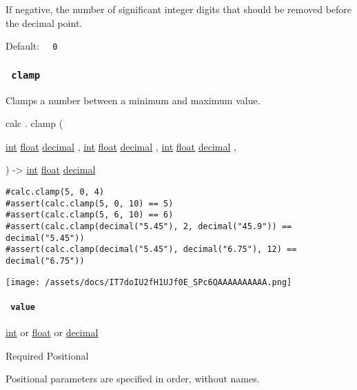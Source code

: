 If negative, the number of significant integer digits that should be
removed before the decimal point.

Default: \texttt{\ }{\texttt{\ 0\ }}\texttt{\ }

\subsubsection{\texorpdfstring{\texttt{\ clamp\ }}{ clamp }}\label{functions-clamp}

Clamps a number between a minimum and maximum value.

calc { . } { clamp } (

{ \href{/docs/reference/foundations/int/}{int}
\href{/docs/reference/foundations/float/}{float}
\href{/docs/reference/foundations/decimal/}{decimal} , } {
\href{/docs/reference/foundations/int/}{int}
\href{/docs/reference/foundations/float/}{float}
\href{/docs/reference/foundations/decimal/}{decimal} , } {
\href{/docs/reference/foundations/int/}{int}
\href{/docs/reference/foundations/float/}{float}
\href{/docs/reference/foundations/decimal/}{decimal} , }

) -\textgreater{} \href{/docs/reference/foundations/int/}{int}
\href{/docs/reference/foundations/float/}{float}
\href{/docs/reference/foundations/decimal/}{decimal}

\begin{verbatim}
#calc.clamp(5, 0, 4)
#assert(calc.clamp(5, 0, 10) == 5)
#assert(calc.clamp(5, 6, 10) == 6)
#assert(calc.clamp(decimal("5.45"), 2, decimal("45.9")) == decimal("5.45"))
#assert(calc.clamp(decimal("5.45"), decimal("6.75"), 12) == decimal("6.75"))
\end{verbatim}

\texttt{[image: /assets/docs/IT7doIU2fH1UJf0E\_SPc6QAAAAAAAAAA.png]}

\paragraph{\texorpdfstring{\texttt{\ value\ }}{ value }}\label{functions-clamp-value}

\href{/docs/reference/foundations/int/}{int} {or}
\href{/docs/reference/foundations/float/}{float} {or}
\href{/docs/reference/foundations/decimal/}{decimal}

{Required} {{ Positional }}

\label{functions-clamp-value-positional-tooltip}
Positional parameters are specified in order, without names.

